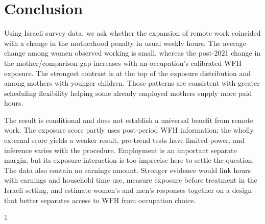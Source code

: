 \documentclass[12pt,a4paper]{article}
\begin{document}
\section{Conclusion}\label{sec:conclusion}
Using Israeli survey data, we ask whether the expansion of remote work coincided with a change in the motherhood penalty in usual weekly hours. The average change among women observed working is small, whereas the post-2021 change in the mother/comparison gap increases with an occupation's calibrated WFH exposure. The strongest contrast is at the top of the exposure distribution and among mothers with younger children. Those patterns are consistent with greater scheduling flexibility helping some already employed mothers supply more paid hours.

The result is conditional and does not establish a universal benefit from remote work. The exposure score partly uses post-period WFH information; the wholly external score yields a weaker result, pre-trend tests have limited power, and inference varies with the procedure. Employment is an important separate margin, but its exposure interaction is too imprecise here to settle the question. The data also contain no earnings amount. Stronger evidence would link hours with earnings and household time use, measure exposure before treatment in the Israeli setting, and estimate women's and men's responses together on a design that better separates access to WFH from occupation choice.

\begin{spacing}{1}


\end{spacing}
\end{document}
